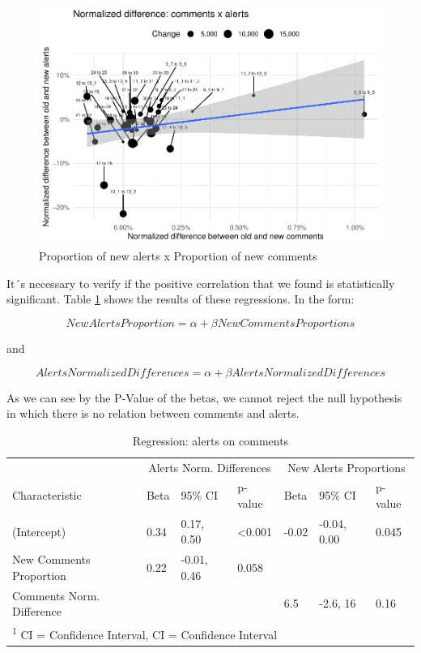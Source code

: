 \documentclass[
]{article}
\begin{document}
\begin{figure}
\centering
\includegraphics{report_files/figure-latex/unnamed-chunk-28-1.pdf}
\caption{\label{scatter_diff}Proportion of new alerts x Proportion of
new comments}
\end{figure}

\normalsize

It´s necessary to verify if the positive correlation that we found is
statistically significant. Table \ref{tab_reg} shows the results of
these regressions. In the form:

\[ NewAlertsProportion = \alpha + \beta NewCommentsProportions \]

and

\[ AlertsNormalizedDifferences = \alpha + \beta AlertsNormalizedDifferences \]

As we can see by the P-Value of the betas, we cannot reject the null
hypothesis in which there is no relation between comments and alerts.

\small

\begin{table}

\caption{\label{tab:unnamed-chunk-29}\label{tab_reg} Regression: alerts on comments}
\centering
\begin{tabular}[t]{l|l|l|l|l|l|l}
\hline
\multicolumn{1}{c|}{ } & \multicolumn{3}{c|}{Alerts Norm. Differences} & \multicolumn{3}{c}{New Alerts Proportions} \\
\cline{2-4} \cline{5-7}
Characteristic & Beta & 95\% CI & p-value & Beta & 95\% CI & p-value\\
\hline
(Intercept) & 0.34 & 0.17, 0.50 & <0.001 & -0.02 & -0.04, 0.00 & 0.045\\
\hline
New Comments Proportion & 0.22 & -0.01, 0.46 & 0.058 &  &  & \\
\hline
Comments Norm. Difference &  &  &  & 6.5 & -2.6, 16 & 0.16\\
\hline
\multicolumn{7}{l}{\textsuperscript{1} CI = Confidence Interval, CI = Confidence Interval}\\
\end{tabular}
\end{table}
\end{document}
